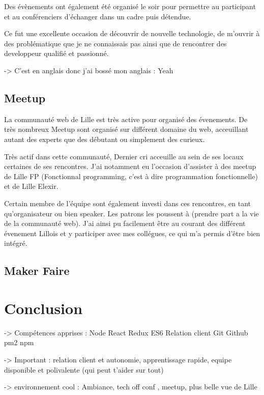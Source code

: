 \documentclass[12pt,a4paper]{article}
\begin{document}
  Des évènements ont également été organisé le soir pour permettre au
  participant et au conférenciers d'échanger dans un cadre puis détendue.

  \bigskip

  Ce fut une excellente occasion de découvrir de nouvelle technologie, de
  m'ouvrir à des problématique que je ne connaissais pas ainsi que de
  rencontrer des developpeur qualifié et passionné.

  -\textgreater{} C'est en anglais donc j'ai bossé mon anglais : Yeah

  \subsection{Meetup}\label{meetup}

  \bigskip

  La communauté web de Lille est très active pour organisé des évenements.
  De très nombreux Meetup sont organisé sur différent domaine du web,
  acceuillant autant des experts que des débutant ou simplement des
  curieux.

  \bigskip

  Très actif dans cette communauté, Dernier cri acceuille au sein de ses
  locaux certaines de ses rencontres. J'ai notamment eu l'occasion
  d'assister à des meetup de Lille FP (Fonctionnal programming, c'est à
  dire programmation fonctionnelle) et de Lille Elexir.

  \bigskip

  Certain membre de l'équipe sont également investi dans ces rencontres,
  en tant qu'organisateur ou bien speaker. Les patrons les poussent à
  (prendre part a la vie de la communauté web). J'ai ainsi pu facilement
  être au courant des différent évenement Lillois et y participer avec mes
  collégues, ce qui m'a permis d'être bien intégré.

  \bigskip

  \subsection{Maker Faire}\label{maker-faire}

  \bigskip

  \bigskip

  \section{Conclusion}\label{conclusion-1}

  -\textgreater{} Compétences apprises : Node React Redux ES6 Relation
  client Git Github pm2 npm

  -\textgreater{} Important : relation client et autonomie, apprentissage
  rapide, equipe disponible et polivalente (qui peut t'aider sur tout)

  -\textgreater{} environnement cool : Ambiance, tech off conf , meetup,
  plus belle vue de Lille
\end{document}
